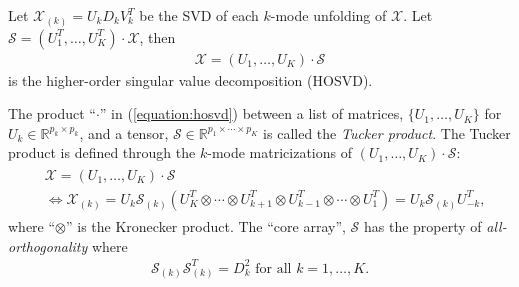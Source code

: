 \begin{definition}
  Let $\mathcal{X}_{(k)} = U_kD_kV_k^T$ be the SVD of each $k$-mode unfolding of $\mathcal{X}$. Let $\mathcal{S} = (U_1^T,\ldots,U_K^T)\cdot\mathcal{X}$, then
  \begin{align}
    \label{equation:hosvd}
    \mathcal{X} = (U_1,\ldots,U_K)\cdot \mathcal{S}
  \end{align}
is the higher-order singular value decomposition (HOSVD).
\end{definition}
The product ``$\cdot$'' in (\ref{equation:hosvd}) between a list of matrices, $\{U_1,\ldots,U_K\}$ for $U_k \in \mathbb{R}^{p_k \times p_k}$, and a tensor, $\mathcal{S} \in \mathbb{R}^{p_1\times\cdots\times p_K}$ is called the \emph{Tucker product}. The Tucker product is defined through the $k$-mode matricizations of $(U_1,\ldots,U_K)\cdot \mathcal{S}$:
\begin{align*}
  \begin{split}
    &\mathcal{X} = (U_1,\ldots,U_K)\cdot \mathcal{S}\\
    &\Leftrightarrow \mathcal{X}_{(k)} = U_k\mathcal{S}_{(k)}(U_K^T\otimes\cdots\otimes U_{k+1}^T\otimes U_{k-1}^T\otimes\cdots\otimes U_1^T) = U_k\mathcal{S}_{(k)}U_{-k}^T,
  \end{split}
\end{align*}
where ``$\otimes$'' is the Kronecker product.
The ``core array'', $\mathcal{S}$ has the property of \emph{all-orthogonality} where
\begin{align*}
  \mathcal{S}_{(k)}\mathcal{S}_{(k)}^T = D_k^2 \text{ for all } k = 1,\ldots,K.
\end{align*}

